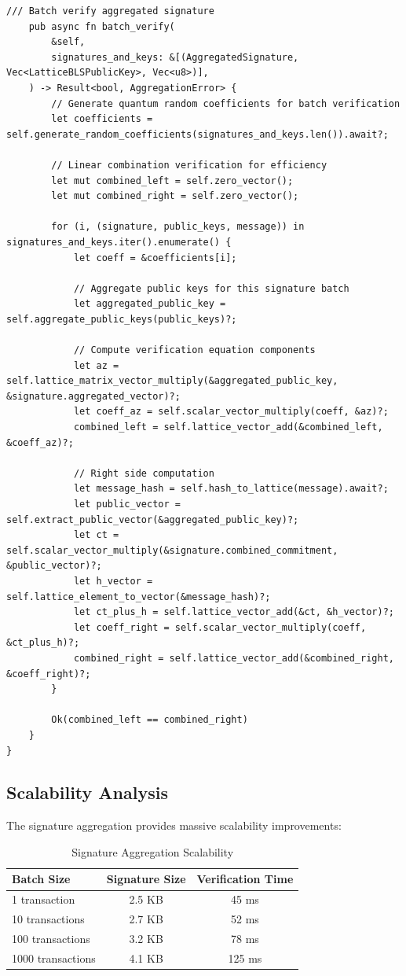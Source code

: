 \documentclass[12pt,a4paper]{article}
\begin{document}
\begin{lstlisting}[style=rustcode, caption=Quantum Signature Aggregation]
    /// Batch verify aggregated signature
    pub async fn batch_verify(
        &self,
        signatures_and_keys: &[(AggregatedSignature, Vec<LatticeBLSPublicKey>, Vec<u8>)],
    ) -> Result<bool, AggregationError> {
        // Generate quantum random coefficients for batch verification
        let coefficients = self.generate_random_coefficients(signatures_and_keys.len()).await?;
        
        // Linear combination verification for efficiency
        let mut combined_left = self.zero_vector();
        let mut combined_right = self.zero_vector();
        
        for (i, (signature, public_keys, message)) in signatures_and_keys.iter().enumerate() {
            let coeff = &coefficients[i];
            
            // Aggregate public keys for this signature batch
            let aggregated_public_key = self.aggregate_public_keys(public_keys)?;
            
            // Compute verification equation components
            let az = self.lattice_matrix_vector_multiply(&aggregated_public_key, &signature.aggregated_vector)?;
            let coeff_az = self.scalar_vector_multiply(coeff, &az)?;
            combined_left = self.lattice_vector_add(&combined_left, &coeff_az)?;
            
            // Right side computation
            let message_hash = self.hash_to_lattice(message).await?;
            let public_vector = self.extract_public_vector(&aggregated_public_key)?;
            let ct = self.scalar_vector_multiply(&signature.combined_commitment, &public_vector)?;
            let h_vector = self.lattice_element_to_vector(&message_hash)?;
            let ct_plus_h = self.lattice_vector_add(&ct, &h_vector)?;
            let coeff_right = self.scalar_vector_multiply(coeff, &ct_plus_h)?;
            combined_right = self.lattice_vector_add(&combined_right, &coeff_right)?;
        }
        
        Ok(combined_left == combined_right)
    }
}
\end{lstlisting}

\subsection{Scalability Analysis}

The signature aggregation provides massive scalability improvements:

\begin{table}[h]
\centering
\begin{tabular}{lcc}
\toprule
Batch Size & Signature Size & Verification Time \\
\midrule
1 transaction & 2.5 KB & 45 ms \\
10 transactions & 2.7 KB & 52 ms \\
100 transactions & 3.2 KB & 78 ms \\
1000 transactions & 4.1 KB & 125 ms \\
\bottomrule
\end{tabular}
\caption{Signature Aggregation Scalability}
\end{table}
\end{document}
